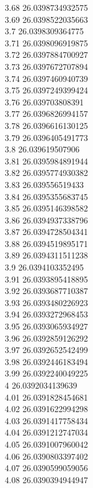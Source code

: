 {3.68	26.0398734932575\\
3.69	26.0398522035663\\
3.7	26.0398309364775\\
3.71	26.0398096919875\\
3.72	26.0397884700927\\
3.73	26.0397672707894\\
3.74	26.0397460940739\\
3.75	26.0397249399424\\
3.76	26.039703808391\\
3.77	26.0396826994157\\
3.78	26.0396616130125\\
3.79	26.0396405491773\\
3.8	26.039619507906\\
3.81	26.0395984891944\\
3.82	26.0395774930382\\
3.83	26.039556519433\\
3.84	26.0395355683745\\
3.85	26.0395146398582\\
3.86	26.0394937338796\\
3.87	26.0394728504341\\
3.88	26.0394519895171\\
3.89	26.0394311511238\\
3.9	26.0394103352495\\
3.91	26.0393895418895\\
3.92	26.0393687710387\\
3.93	26.0393480226923\\
3.94	26.0393272968453\\
3.95	26.0393065934927\\
3.96	26.0392859126292\\
3.97	26.0392652542499\\
3.98	26.0392446183494\\
3.99	26.0392240049225\\
4	26.0392034139639\\
4.01	26.0391828454681\\
4.02	26.0391622994298\\
4.03	26.0391417758434\\
4.04	26.0391212747034\\
4.05	26.0391007960042\\
4.06	26.0390803397402\\
4.07	26.0390599059056\\
4.08	26.0390394944947\\
}
